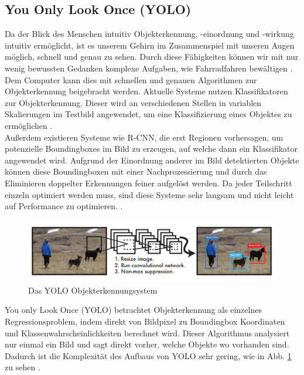 {	\subsection{You Only Look Once (YOLO)}
	{Da der Blick des Menschen intuitiv Objekterkennung, -einordnung und -wirkung intuitiv ermöglicht, ist es unserem Gehirn im Zusammenspiel mit unseren Augen möglich, schnell und genau zu sehen. Durch diese Fähigkeiten können wir mit nur wenig bewussten Gedanken komplexe Aufgaben, wie Fahrradfahren bewältigen \citep{Plastiras2018}. \\
	Dem Computer kann dies mit schnellen und genauen Algorithmen zur Objekterkennung beigebracht werden. Aktuelle Systeme nutzen Klassifikatoren zur Objekterkennung. Dieser wird an verschiedenen Stellen in variablen Skalierungen im Testbild angewendet, um eine Klassifizierung eines Objektes zu ermöglichen \citep{Plastiras2018}. \\ 
	Außerdem existieren Systeme wie R-CNN, die erst Regionen vorhersagen, um potenzielle Boundingboxes im Bild zu erzeugen, auf welche dann ein Klassifikator angewendet wird. Aufgrund der Einordnung anderer im Bild detektierten Objekte können diese Boundingboxen mit einer Nachprozessierung und durch das Eliminieren doppelter Erkennungen feiner aufgelöst werden. Da jeder Teilschritt einzeln optimiert werden muss, sind diese Systeme sehr langsam und nicht leicht auf Performance zu optimieren. \citep{Plastiras2018}. \\
	\begin{figure}[ht]
		\centering
		\includegraphics*[scale = 1, keepaspectratio, trim=2 2 2 2 ]{images/YOLO/YOLO_detection_system.png}
		\caption[Das YOLO Objekterkennungsystem]{Das YOLO Objekterkennungsystem \citep{Plastiras2018}}
		\label{YOLO_Objecterkennungssystem}
 	\end{figure}
	\glqq You only Look Once\grqq{} (YOLO) betrachtet Objekterkennung als einzelnes Regressionsproblem, indem direkt von Bildpixel zu Boundingbox Koordinaten und Klassenwahrscheinlichkeiten berechnet wird. Dieser Algorithmus analysiert nur einmal ein Bild und sagt direkt vorher, welche Objekte wo vorhanden sind. Dadurch ist die Komplexität des  Aufbaus von YOLO sehr gering, wie in Abb. \ref{YOLO_Objecterkennungssystem} zu sehen \citep{Plastiras2018}. \\
}}
